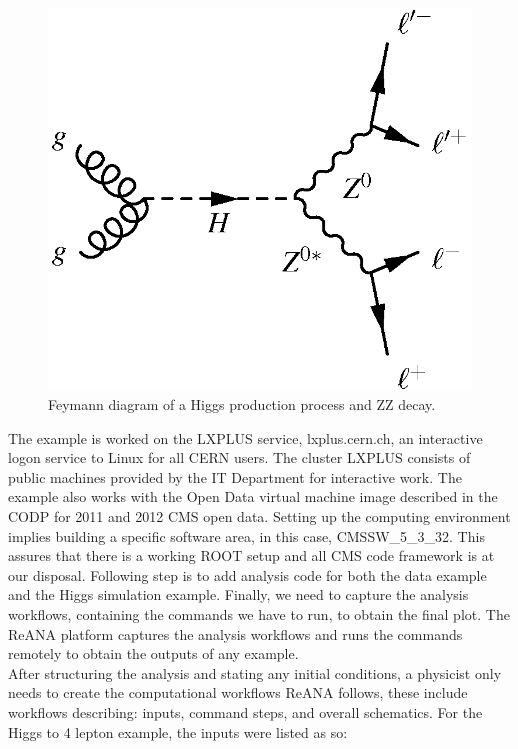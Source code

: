\documentclass[letter]{article}
\newcommand\tab[1][1cm]{\hspace*{#1}}
\begin{document}
\begin{figure}[H]
    \centering
    \includegraphics[scale=0.65]{HZZ}
    \caption{Feymann diagram of a Higgs production process and ZZ decay.}
    \label{fig:HZZ}
\end{figure}
\newline %
\hspace{5pt} The example is worked on the LXPLUS service\cite{lxplus}, lxplus.cern.ch, an interactive logon service to Linux for all CERN users. The cluster LXPLUS consists of public machines provided by the IT Department for interactive work. The example also works with the Open Data virtual machine image  described in the CODP for 2011 and 2012 CMS open data\cite{codpvm}.
Setting up the computing environment implies building a specific software area, in this case, CMSSW\_5\_3\_32. This assures that there is a working ROOT setup and all CMS code framework is at our disposal. Following step is to add analysis code for both the data example and the Higgs simulation example. Finally, we need to capture the analysis workflows, containing the commands we have to run, to obtain the final plot. The ReANA platform captures the analysis workflows and runs the commands remotely to obtain the outputs of any example.\vspace{5pt}
\\
\tab After structuring the analysis and stating any initial conditions, a physicist only needs to create the computational workflows ReANA follows, these include workflows describing: inputs, command steps, and overall schematics. For the Higgs to 4 lepton example, the inputs were listed as so:
\end{document}
